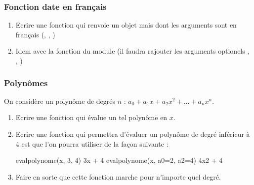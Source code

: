 \documentclass[letterpaper,10pt,english]{sphinxhowto}
\begin{document}
\subsubsection{Fonction date en français}
\label{\detokenize{cours1_fonctions_exercices:fonction-date-en-francais}}\begin{enumerate}
%
\item {} 
\sphinxAtStartPar
Ecrire une fonction  qui renvoie un objet  mais dont les arguments sont en français (, , )

\item {} 
\sphinxAtStartPar
Idem avec la fonction  du module  (il faudra rajouter les arguments optionels , , )

\end{enumerate}


\subsubsection{Polynômes}
\label{\detokenize{cours1_fonctions_exercices:polynomes}}
\sphinxAtStartPar
On considère un polynôme de degrés \(n\) : \(a_0 + a_1x + a_2x^2 + ... + a_n x^n\).
\begin{enumerate}
%
\item {} 
\sphinxAtStartPar
Ecrire une fonction  qui évalue un tel polynôme en \(x\).

\item {} 
\sphinxAtStartPar
Ecrire une fonction qui permettra d’évaluer un polynôme de degré inférieur à 4 est que l’on pourra utiliser de la façon suivante :

\begin{sphinxVerbatim}[commandchars=\\\{\}]
 eval\PYGZus{}polynome(x, 3, 4) \PYGZsh{} 3x + 4
 eval\PYGZus{}polynome(x, a\PYGZus{}0=2, a\PYGZus{}2=4) \PYGZsh{} 4x\PYGZca{}2 + 4
\end{sphinxVerbatim}

\item {} 
\sphinxAtStartPar
Faire en sorte que cette fonction marche pour n’importe quel degré.

\end{enumerate}
\end{document}
